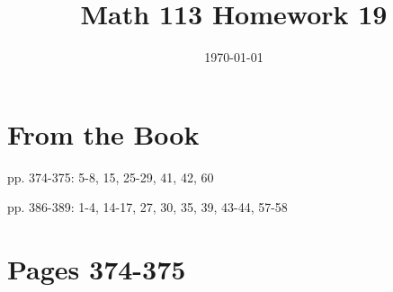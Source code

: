 \documentclass[fleqn,addpoints]{exam}
\title{Math 113 Homework 19}
\author{}
\date{\today}
\begin{document}
\maketitle

\section{From the Book}

\begin{itemize*}
  \item pp. 374-375: 5-8, 15, 25-29, 41, 42, 60
  \item pp. 386-389: 1-4, 14-17, 27, 30, 35, 39, 43-44, 57-58
\end{itemize*}

\ifprintanswers
\section{Pages 374-375}
\end{document}
